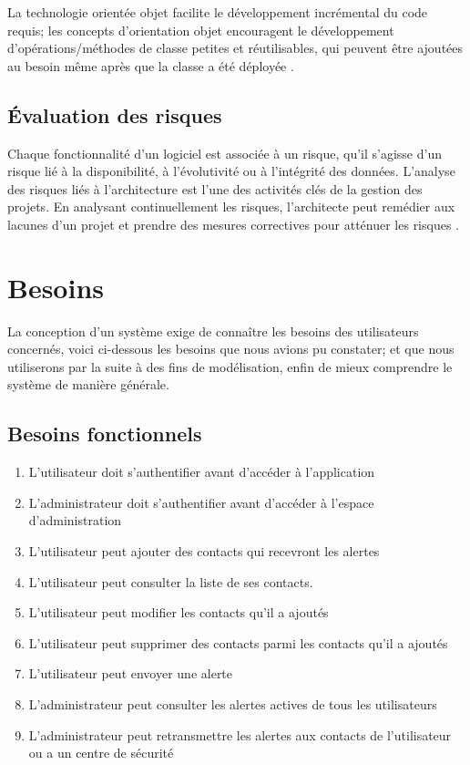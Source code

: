 La technologie orientée objet facilite le développement incrémental du code requis; les concepts d'orientation objet encouragent le développement d'opérations/méthodes de classe petites et réutilisables, qui peuvent être ajoutées au besoin même après que la classe a été déployée \cite{the_dsdm_consortium_dsdm}.


\subsection{Évaluation des risques}
Chaque fonctionnalité d’un logiciel est associée à un risque, qu'il s'agisse d'un risque lié à la disponibilité, à l'évolutivité ou à l'intégrité des données. L'analyse des risques liés à l'architecture est l'une des activités clés de la gestion des projets. En analysant continuellement les risques, l'architecte peut remédier aux lacunes d’un projet et prendre des mesures correctives pour atténuer les risques \cite{mark_richards_fundamentals}.

\section{Besoins}
La conception d’un système exige de connaître les besoins des utilisateurs concernés, voici ci-dessous les besoins que nous avions pu constater; et que nous utiliserons par la suite à des fins de modélisation, enfin de mieux comprendre le système de manière générale.

\subsection{Besoins fonctionnels}
\begin{enumerate}
	\item L’utilisateur doit s’authentifier avant d’accéder à l’application
	\item L’administrateur doit s’authentifier avant d’accéder à l’espace d’administration
	\item L’utilisateur peut ajouter des contacts qui recevront les alertes
	\item L’utilisateur peut consulter la liste de ses contacts.
	\item L’utilisateur peut modifier les contacts qu’il a ajoutés
	\item L’utilisateur peut supprimer des contacts parmi les contacts qu’il a ajoutés
	\item L’utilisateur peut envoyer une alerte
	\item L’administrateur peut consulter les alertes actives de tous les utilisateurs
	\item L’administrateur peut retransmettre les alertes aux contacts de l’utilisateur ou a un centre de sécurité
\end{enumerate}


